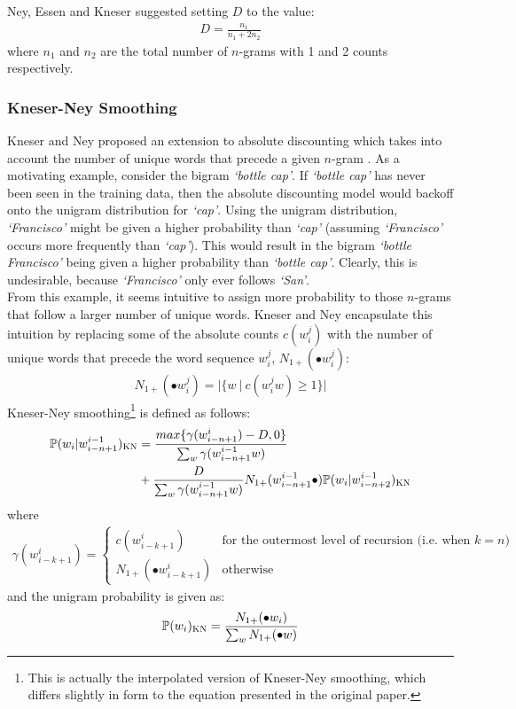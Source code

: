 \documentclass[a4paper, 12pt]{report}
\newcommand{\tit}[1]{\textit{#1}}
\begin{document}
Ney, Essen and Kneser \cite{absolute_discounting:ney1994} suggested setting $D$ to the value:
\begin{gather}
	D = \frac{n_1}{n_1 + 2n_2}
\end{gather}
where $n_1$ and $n_2$ are the total number of $n$-grams with 1 and 2 counts respectively.

\subsubsection{Kneser-Ney Smoothing}

Kneser and Ney proposed an extension to absolute discounting which takes into account the number of unique words that precede a given $n$-gram \cite{kneser_ney_smoothing:kneser1995}. As a motivating example, consider the bigram \tit{`bottle cap'}. If \tit{`bottle cap'} has never been seen in the training data, then the absolute discounting model would backoff onto the unigram distribution for \tit{`cap'}. Using the unigram distribution, \tit{`Francisco'} might be given a higher probability than \tit{`cap'} (assuming \tit{`Francisco'} occurs more frequently than \tit{`cap'}). This would result in the bigram \tit{`bottle Francisco'} being given a higher probability than \tit{`bottle cap'}. Clearly, this is undesirable, because \tit{`Francisco'} only ever follows \tit{`San'}. \\

From this example, it seems intuitive to assign more probability to those $n$-grams that follow a larger number of unique words. Kneser and Ney encapsulate this intuition by replacing some of the absolute counts $c(w_i^j)$ with the number of unique words that precede the word sequence $w_i^j$, $N_{1+}(\bullet w_i^j)$:
\begin{gather*}
	N_{1+}(\bullet w_i^j) = |\{w\ |\ c(w_i^jw) \geq 1\}|
\end{gather*}
Kneser-Ney smoothing\footnote{This is actually the interpolated version of Kneser-Ney smoothing, which differs slightly in form to the equation presented in the original paper.} is defined as follows:
\begin{align*}
	\mathbb{P}(w_i | w_{i - n + 1}^{i - 1})_{\text{\scshape KN}} &= \frac{max\{\gamma(w_{i - n + 1}^{i}) - D, 0\}}{\sum_w \gamma(w_{i - n + 1}^{i - 1}w)} \\
	&+ \frac{D}{\sum_w \gamma(w_{i - n + 1}^{i - 1}w)}N_{1+}(w_{i - n + 1}^{i - 1}\bullet)\mathbb{P}(w_i | w_{i - n + 2}^{i - 1})_{\text{\scshape KN}}
\end{align*}
where
\begin{gather*}
	\gamma(w_{i - k + 1}^i) = \begin{cases}
		c(w_{i - k + 1}^i) &\text{for the outermost level of recursion (i.e. when $k = n$)} \\
		N_{1+}(\bullet w_{i - k + 1}^i) &\text{otherwise}
	\end{cases}
\end{gather*}
and the unigram probability is given as:
\begin{gather*}
	\mathbb{P}(w_i)_{\text{\scshape KN}} = \frac{N_{1+}(\bullet w_i)}{\sum_w N_{1+}(\bullet w)}
\end{gather*}
\end{document}
